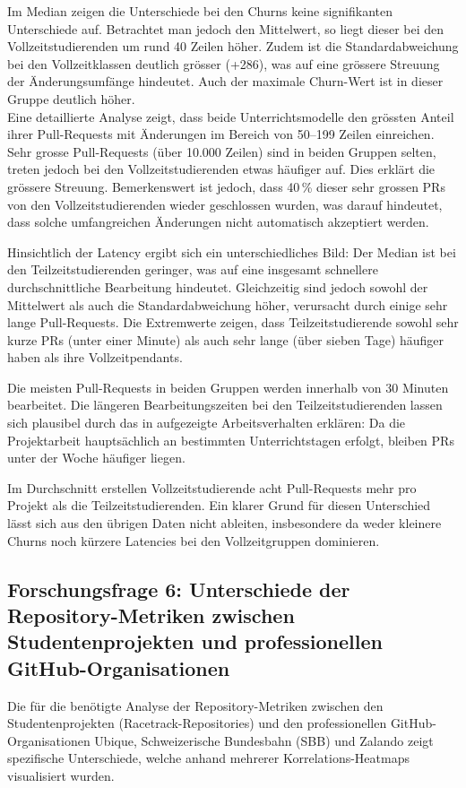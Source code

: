 Im Median zeigen die Unterschiede bei den Churns keine signifikanten Unterschiede auf. Betrachtet man jedoch den Mittelwert, so liegt dieser bei den Vollzeitstudierenden um rund 40 Zeilen höher. Zudem ist die Standardabweichung bei den Vollzeitklassen deutlich grösser (+286), was auf eine grössere Streuung der Änderungsumfänge hindeutet. Auch der maximale Churn-Wert ist in dieser Gruppe deutlich höher. \\
Eine detaillierte Analyse zeigt, dass beide Unterrichtsmodelle den grössten Anteil ihrer Pull-Requests mit Änderungen im Bereich von 50–199 Zeilen einreichen. Sehr grosse Pull-Requests (über 10.000 Zeilen) sind in beiden Gruppen selten, treten jedoch bei den Vollzeitstudierenden etwas häufiger auf. Dies erklärt die grössere Streuung. Bemerkenswert ist jedoch, dass 40\,\% dieser sehr grossen PRs von den Vollzeitstudierenden wieder geschlossen wurden, was darauf hindeutet, dass solche umfangreichen Änderungen nicht automatisch akzeptiert werden.


Hinsichtlich der Latency ergibt sich ein unterschiedliches Bild: Der Median ist bei den Teilzeitstudierenden geringer, was auf eine insgesamt schnellere durchschnittliche Bearbeitung hindeutet. Gleichzeitig sind jedoch sowohl der Mittelwert als auch die Standardabweichung höher, verursacht durch einige sehr lange Pull-Requests. Die Extremwerte zeigen, dass Teilzeitstudierende sowohl sehr kurze PRs (unter einer Minute) als auch sehr lange (über sieben Tage) häufiger haben als ihre Vollzeitpendants.

Die meisten Pull-Requests in beiden Gruppen werden innerhalb von 30 Minuten bearbeitet. Die längeren Bearbeitungszeiten bei den Teilzeitstudierenden lassen sich plausibel durch das in  aufgezeigte Arbeitsverhalten erklären: Da die Projektarbeit hauptsächlich an bestimmten Unterrichtstagen erfolgt, bleiben PRs unter der Woche häufiger liegen.

Im Durchschnitt erstellen Vollzeitstudierende acht Pull-Requests mehr pro Projekt als die Teilzeitstudierenden. Ein klarer Grund für diesen Unterschied lässt sich aus den übrigen Daten nicht ableiten, insbesondere da weder kleinere Churns noch kürzere Latencies bei den Vollzeitgruppen dominieren. 

\subsection{Forschungsfrage 6: Unterschiede der Repository-Metri\-ken zwischen Studentenprojekten und professionellen GitHub-Or\-ganisationen}
Die für die  benötigte Analyse der Repository-Metriken zwischen den Studentenprojekten (Racetrack-Repositories) und den professionellen GitHub-Organisationen Ubique, Schweizerische Bundesbahn (SBB) und Zalando zeigt spezifische Unterschiede, welche anhand mehrerer Korrelations-Heatmaps visualisiert wurden. 

